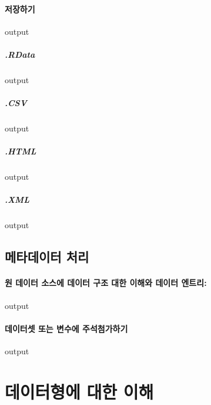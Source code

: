 \documentclass{report}
\begin{document}
\paragraph{저장하기}
\begin{Schunk}
\begin{Soutput}
output
\end{Soutput}
\end{Schunk}
\subparagraph{.RData}
\begin{Schunk}
\begin{Soutput}
output
\end{Soutput}
\end{Schunk}
\subparagraph{.CSV}
\begin{Schunk}
\begin{Soutput}
output
\end{Soutput}
\end{Schunk}
\subparagraph{.HTML}
\begin{Schunk}
\begin{Soutput}
output
\end{Soutput}
\end{Schunk}
\subparagraph{.XML}
\begin{Schunk}
\begin{Soutput}
output
\end{Soutput}
\end{Schunk}

\subsection{메타데이터 처리}
\paragraph{원 데이터 소스에 데이터 구조 대한 이해와 데이터 엔트리: }
\begin{Schunk}
\begin{Soutput}
output
\end{Soutput}
\end{Schunk}

\paragraph{데이터셋 또는 변수에 주석첨가하기}
\begin{Schunk}
\begin{Soutput}
output
\end{Soutput}
\end{Schunk}


\section{데이터형에 대한 이해}
\end{document}
